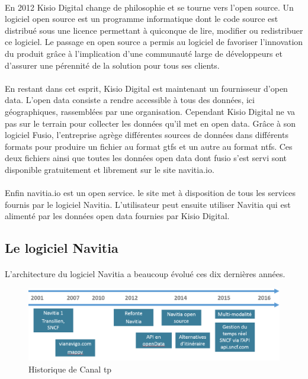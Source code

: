 \documentclass[a4paper]{report}
\begin{document}
\paragraph{} En 2012 Kisio Digital change de philosophie et se tourne vers l'open source. Un logiciel open source est un programme informatique dont le code source est distribué sous une licence permettant à quiconque de lire, modifier ou redistribuer ce logiciel. Le passage en open source a permis au logiciel de favoriser l’innovation du produit grâce à l’implication d’une communauté large de développeurs et d'assurer une pérennité de la solution pour tous ses clients. 

\paragraph{} En restant dans cet esprit, Kisio Digital est maintenant un fournisseur d'open data. L'open data consiste a rendre accessible à tous des données, ici géographiques, rassemblées par une organisation. Cependant Kisio Digital ne va pas sur le terrain pour collecter les données qu'il met en open data. Grâce à son logiciel Fusio, l'entreprise agrège différentes sources de données dans différents formats pour produire un fichier au format gtfs et un autre au format ntfs. Ces deux fichiers ainsi que toutes les données open data dont fusio s'est servi sont disponible gratuitement et librement sur le site navitia.io.

\paragraph{} Enfin navitia.io est un open service. le site met à disposition de tous les services fournis par le logiciel Navitia. L'utilisateur peut ensuite utiliser Navitia qui est alimenté par les données open data fournies par Kisio Digital. 

\subsection{Le logiciel Navitia}

\paragraph{} L'architecture du logiciel Navitia a beaucoup évolué ces dix dernières années.

\begin{figure}[H]
	\begin{center}
		\includegraphics[width=400pt]{image/historique_navitia}
		\caption{Historique de Canal tp}
		\label{Historique de Canal tp}
	\end{center}
\end{figure}
\end{document}
